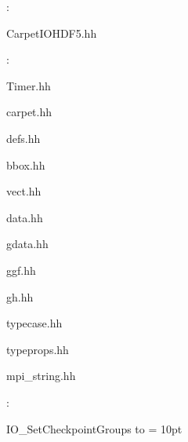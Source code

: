 \vspace{5mm}

: 



CarpetIOHDF5.hh
\vspace{2mm}

: 

Timer.hh

carpet.hh

defs.hh

bbox.hh

vect.hh

data.hh

gdata.hh

ggf.hh

gh.hh

typecase.hh

typeprops.hh

mpi\_string.hh
\vspace{2mm}

: 



IO\_SetCheckpointGroups to 
\vspace{2mm}\parskip = 10pt 
